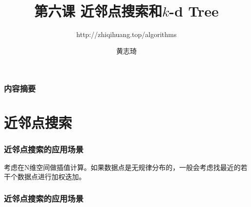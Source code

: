 \documentclass[CJK,14pt]{beamer}
\begin{document}
\bch

\title{第六课  近邻点搜索和$k$-d Tree}
\subtitle{http://zhiqihuang.top/algorithms}
  \author{黄志琦}
  \date{}

  \maketitle

  \begin{frame}
    \frametitle{内容摘要}
  \tableofcontents
  \end{frame}

  \section{近邻点搜索}

  \begin{frame}
    \frametitle{近邻点搜索的应用场景}
    考虑在N维空间做插值计算。如果数据点是无规律分布的，一般会考虑找最近的若干个数据点进行加权迭加。    
  \end{frame}

  \begin{frame}
    \frametitle{近邻点搜索的应用场景}

    
  \end{frame}

  
  \ech
\end{document}
